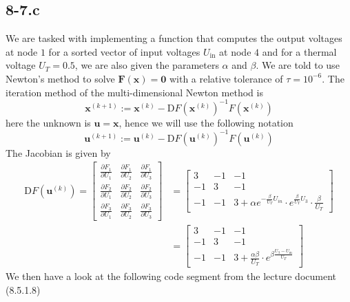 \documentclass{article}
\begin{document}
\subsection*{8-7.c}
We are tasked with implementing a function that computes the output voltages at node $1$ for a sorted vector of input voltages $U_{\text{in}}$ at node $4$ and for a thermal voltage $U_{T} = 0.5$, we are also given the parameters $\alpha$ and $\beta$. We are told to use Newton's method to solve $\mathbf{F}\left(\mathbf{x}\right) = \mathbf{0}$ with a relative tolerance of $\tau = 10^{-6}$. The iteration method of the multi-dimensional Newton method is
\begin{equation*}
    \mathbf{x}^{\left(k+1\right)} := \mathbf{x}^{\left(k\right)} - \mathrm{D}F\left(\mathbf{x}^{\left(k\right)}\right)^{-1}F\left(\mathbf{x}^{\left(k\right)}\right)
\end{equation*}
here the unknown is $\mathbf{u} = \mathbf{x}$, hence we will use the following notation
\begin{equation*}
    \mathbf{u}^{\left(k+1\right)} := \mathbf{u}^{\left(k\right)} - \mathrm{D}F\left(\mathbf{u}^{\left(k\right)}\right)^{-1}F\left(\mathbf{u}^{\left(k\right)}\right)
\end{equation*}
The Jacobian is given by 
\begin{align*}
    \mathrm{D}F\left(\mathbf{u}^{\left(k\right)}\right) = 
    \begin{bmatrix}
        \frac{\partial F_{1}}{\partial U_{1}} &  \frac{\partial F_{1}}{\partial U_{2}} & \frac{\partial F_{1}}{\partial U_{3}}  \\[1mm]
        \frac{\partial F_{2}}{\partial U_{1}} &  \frac{\partial F_{2}}{\partial U_{2}} & \frac{\partial F_{2}}{\partial U_{3}}  \\[1mm]
        \frac{\partial F_{3}}{\partial U_{1}} &  \frac{\partial F_{3}}{\partial U_{2}} & \frac{\partial F_{3}}{\partial U_{3}}  
    \end{bmatrix} &= \begin{bmatrix}
        3 & -1 & -1 \\
        -1 & 3 & -1 \\
        -1 & -1 & 3 + \alpha e^{-\frac{\beta}{U_{T}}U_{in}}\cdot e^{\frac{\beta}{U_{T}}U_{3}}\cdot \frac{\beta}{U_{T}}
    \end{bmatrix} \\
    &= \begin{bmatrix}
        3 & -1 & -1 \\
        -1 & 3 & -1 \\
        -1 & -1 & 3 + \frac{\alpha\beta}{U_{T}} \cdot e^{\beta\frac{U_{3}-U_{\text{in}}}{U_{T}}}
    \end{bmatrix}
\end{align*}
We then have a look at the following code segment from the lecture document (8.5.1.8)
\end{document}
